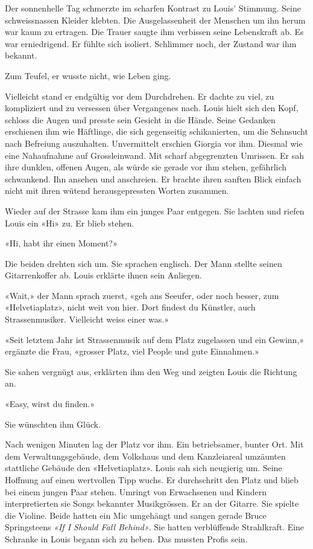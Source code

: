 \sectionbreak

Der sonnenhelle Tag schmerzte im scharfen Kontrast zu Louis’ Stimmung. Seine schweissnassen Kleider klebten.
Die Ausgelassenheit der Menschen um ihn herum war kaum zu ertragen. Die Trauer saugte ihm
verbissen seine Lebenskraft ab. Es war erniedrigend. Er fühlte sich isoliert. Schlimmer noch, der Zustand war ihm bekannt.

Zum Teufel, er wusste nicht, wie Leben ging.

Vielleicht stand er endgültig vor dem Durchdrehen. Er dachte zu viel, zu kompliziert und zu versessen über Vergangenes nach. Louis hielt sich den Kopf, schloss die Augen und presste sein Gesicht in die Hände. Seine Gedanken erschienen ihm wie Häftlinge, die sich gegenseitig schikanierten, um die Sehnsucht nach Befreiung auszuhalten. 
Unvermittelt erschien Giorgia vor ihm. Diesmal wie eine Nahaufnahme auf Grossleinwand. Mit scharf abgegrenzten Umrissen.
Er sah ihre dunklen, offenen Augen, als würde sie gerade vor ihm stehen, gefährlich schwankend. Ihn ansehen und anschreien. Er brachte ihren sanften Blick einfach nicht mit ihren wütend herausgepressten Worten zusammen. 

\sectionbreak

Wieder auf der Strasse kam ihm ein junges Paar entgegen. Sie lachten und riefen Louis ein «Hi» zu. Er blieb stehen.

«Hi, habt ihr einen Moment?»

Die beiden drehten sich um. Sie sprachen englisch. Der Mann stellte seinen Gitarrenkoffer ab. Louis erklärte ihnen sein Anliegen.

«Wait,» der Mann sprach zuerst, «geh ans Seeufer, oder noch
besser, zum «Helvetiaplatz», nicht weit von hier. Dort findest du
Künstler, auch Strassenmusiker. Vielleicht weiss einer was.»

«Seit letztem Jahr ist Strassenmusik auf dem Platz zugelassen und ein
Gewinn,» ergänzte die Frau, «grosser Platz, viel People und gute Einnahmen.»

Sie sahen vergnügt aus, erklärten ihm den Weg und zeigten Louis die
Richtung an.

«Easy, wirst du finden.»

Sie wünschten ihm Glück. 

Nach wenigen Minuten lag der Platz vor ihm. Ein betriebsamer, bunter Ort. 
Mit dem Verwaltungsgebäude, dem Volkshaus und dem Kanzleiareal umzäunten stattliche Gebäude den «Helvetiaplatz».
Louis sah sich neugierig um. Seine Hoffnung auf einen wertvollen Tipp wuchs.
Er durchschritt den Platz und blieb bei einem jungen Paar stehen.
Umringt von Erwachsenen und Kindern interpretierten sie Songs bekannter Musikgrössen. Er an der Gitarre. 
Sie spielte die Violine. Beide hatten ein Mic umgehängt und sangen gerade Bruce Springsteens \emph{«If I
Should Fall Behind»}. Sie hatten verblüffende Strahlkraft. Eine Schranke in Louis begann sich zu heben. Das mussten Profis sein.

